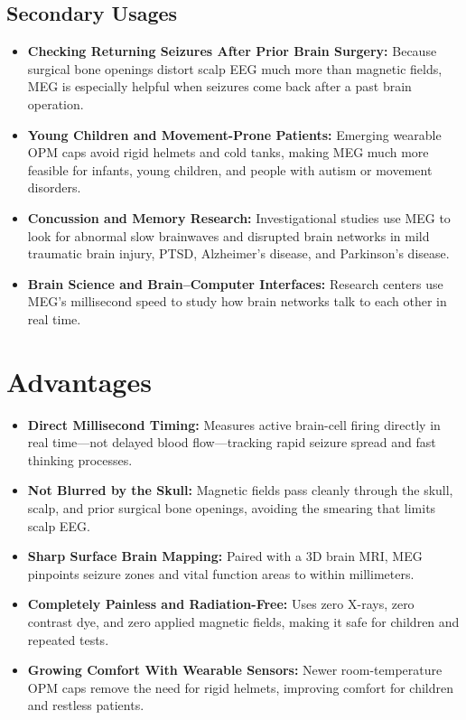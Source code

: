 \subsection{Secondary Usages}
\begin{itemize}
  \item \textbf{Checking Returning Seizures After Prior Brain Surgery:} Because surgical bone openings distort scalp EEG much more than magnetic fields, MEG is especially helpful when seizures come back after a past brain operation.
  \item \textbf{Young Children and Movement-Prone Patients:} Emerging wearable OPM caps avoid rigid helmets and cold tanks, making MEG much more feasible for infants, young children, and people with autism or movement disorders.
  \item \textbf{Concussion and Memory Research:} Investigational studies use MEG to look for abnormal slow brainwaves and disrupted brain networks in mild traumatic brain injury, PTSD, Alzheimer's disease, and Parkinson's disease.
  \item \textbf{Brain Science and Brain--Computer Interfaces:} Research centers use MEG's millisecond speed to study how brain networks talk to each other in real time.
\end{itemize}

\section{Advantages}
\begin{itemize}
  \item \textbf{Direct Millisecond Timing:} Measures active brain-cell firing directly in real time---not delayed blood flow---tracking rapid seizure spread and fast thinking processes.
  \item \textbf{Not Blurred by the Skull:} Magnetic fields pass cleanly through the skull, scalp, and prior surgical bone openings, avoiding the smearing that limits scalp EEG.
  \item \textbf{Sharp Surface Brain Mapping:} Paired with a 3D brain MRI, MEG pinpoints seizure zones and vital function areas to within millimeters.
  \item \textbf{Completely Painless and Radiation-Free:} Uses zero X-rays, zero contrast dye, and zero applied magnetic fields, making it safe for children and repeated tests.
  \item \textbf{Growing Comfort With Wearable Sensors:} Newer room-temperature OPM caps remove the need for rigid helmets, improving comfort for children and restless patients.
\end{itemize}

